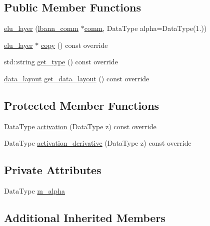 \subsection*{Public Member Functions}
\begin{DoxyCompactItemize}
\item 
\hyperlink{classlbann_1_1elu__layer_a37a371015add326278f7a537ade73e30}{elu\+\_\+layer} (\hyperlink{classlbann_1_1lbann__comm}{lbann\+\_\+comm} $\ast$\hyperlink{file__io_8cpp_ab048c6f9fcbcfaa57ce68b00263dbebe}{comm}, Data\+Type alpha=Data\+Type(1.))
\item 
\hyperlink{classlbann_1_1elu__layer}{elu\+\_\+layer} $\ast$ \hyperlink{classlbann_1_1elu__layer_adc65c53cdd440f516f6018894a9befde}{copy} () const override
\item 
std\+::string \hyperlink{classlbann_1_1elu__layer_a7597f25495bd76ae8716ffd2bfb7afa2}{get\+\_\+type} () const override
\item 
\hyperlink{base_8hpp_a786677cbfb3f5677b4d84f3056eb08db}{data\+\_\+layout} \hyperlink{classlbann_1_1elu__layer_a50f1158f8a6a5b358a311dabd4562948}{get\+\_\+data\+\_\+layout} () const override
\end{DoxyCompactItemize}
\subsection*{Protected Member Functions}
\begin{DoxyCompactItemize}
\item 
Data\+Type \hyperlink{classlbann_1_1elu__layer_a36412ea7156d5c433e31681e70222ad6}{activation} (Data\+Type z) const override
\item 
Data\+Type \hyperlink{classlbann_1_1elu__layer_ae972ed930008d1bbe499996a6f55de7e}{activation\+\_\+derivative} (Data\+Type z) const override
\end{DoxyCompactItemize}
\subsection*{Private Attributes}
\begin{DoxyCompactItemize}
\item 
Data\+Type \hyperlink{classlbann_1_1elu__layer_aaeb8ac055d22365a6f387c01f11db93d}{m\+\_\+alpha}
\end{DoxyCompactItemize}
\subsection*{Additional Inherited Members}


